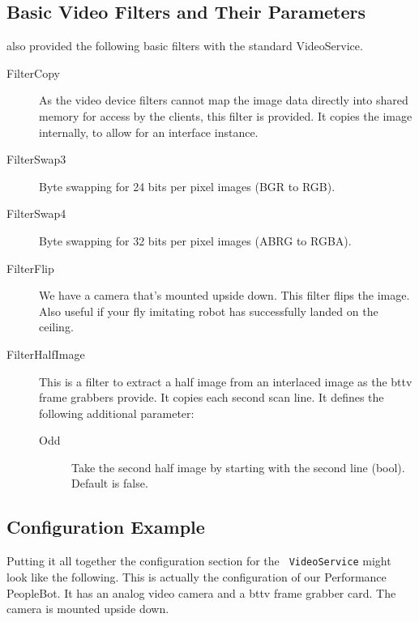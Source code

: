 \subsection{Basic Video Filters and Their Parameters}

\miro also provided the following basic filters with the standard
VideoService.

\begin{description}
\item[FilterCopy] As the video device filters cannot map the image
  data directly into shared memory for access by the clients, this
  filter is provided. It copies the image internally, to allow for an
  interface instance.
\item[FilterSwap3] Byte swapping for 24 bits per pixel images (BGR to RGB).
\item[FilterSwap4] Byte swapping for 32 bits per pixel images (ABRG to
  RGBA).
\item[FilterFlip] We have a camera that's mounted upside down. This
  filter flips the image. Also useful if your fly imitating robot has
  successfully landed on the ceiling.
\item[FilterHalfImage] This is a filter to extract a half image from an
  interlaced image as the bttv frame grabbers provide. It copies each
  second scan line. It defines the
  following additional parameter:
  \begin{description}
  \item[Odd] Take the second half image by starting with the second
    line (bool). Default is false.
  \end{description}
\end{description}

\subsection{Configuration Example}

Putting it all together the configuration section for the {\tt
  VideoService} might look like the following. This is actually the
configuration of our Performance PeopleBot. It has an analog video
camera and a bttv frame grabber card. The camera is mounted upside
down.

